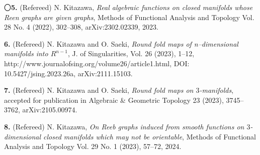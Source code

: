 \documentclass{article}
\begin{document}
\par\noindent
〇{\bf 5.} (Refereed) N. Kitazawa, \textsl{Real algebraic functions on closed manifolds whose Reen graphs are given graphs}, Methods of Functional Analysis and Topology Vol. 28 No. 4 (2022), 302--308, arXiv:2302.02339, 2023.

\par\noindent
{\bf 6.} (Refereed) N. Kitazawa and O. Saeki, \textsl{Round fold maps of n--dimensional manifolds into $R^{n-1}$}, J. of Singularities, Vol. 26 (2023), 1--12,\\ http://www.journalofsing.org/volume26/article1.html, DOI: 10.5427/jsing.2023.26a, arXiv:2111.15103.

\par\noindent
{\bf 7.} (Refereed) N. Kitazawa and O. Saeki, \textsl{Round fold maps on $3$-manifolds}, accepted for publication in Algebraic \& Geometric Topology 23 (2023), 3745--3762, arXiv:2105.00974.

\par\noindent
{\bf 8.} (Refereed) N. Kitazawa, \textsl{On Reeb graphs induced from smooth functions on $3$-dimensional closed manifolds which may not be orientable}, Methods of Functional Analysis and Topology Vol. 29 No. 1 (2023), 57--72, 2024.\\
\ \\
\end{document}
